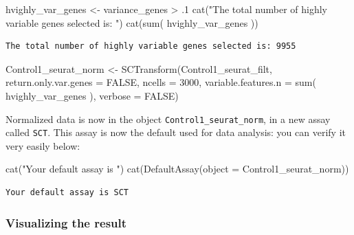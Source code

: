 \documentclass[
  letterpaper,
  DIV=11,
  numbers=noendperiod]{scrartcl}
\newenvironment{Shaded}{\begin{snugshade}}{\end{snugshade}}
\newcommand{\AttributeTok}[1]{\textcolor[rgb]{0.49,0.56,0.16}{#1}}
\newcommand{\ConstantTok}[1]{\textcolor[rgb]{0.53,0.00,0.00}{#1}}
\newcommand{\DecValTok}[1]{\textcolor[rgb]{0.25,0.63,0.44}{#1}}
\newcommand{\FunctionTok}[1]{\textcolor[rgb]{0.02,0.16,0.49}{#1}}
\newcommand{\NormalTok}[1]{\textcolor[rgb]{0.00,0.44,0.13}{#1}}
\newcommand{\OtherTok}[1]{\textcolor[rgb]{0.00,0.44,0.13}{#1}}
\newcommand{\SpecialCharTok}[1]{\textcolor[rgb]{0.25,0.44,0.63}{#1}}
\newcommand{\StringTok}[1]{\textcolor[rgb]{0.25,0.44,0.63}{#1}}
\begin{document}
\begin{Shaded}
\begin{Highlighting}[]
\NormalTok{hvighly\_var\_genes }\OtherTok{\textless{}{-}}\NormalTok{ variance\_genes }\SpecialCharTok{\textgreater{}}\NormalTok{ .}\DecValTok{1}
\FunctionTok{cat}\NormalTok{(}\StringTok{"The total number of highly variable genes selected is: "}\NormalTok{)}
\FunctionTok{cat}\NormalTok{(}\FunctionTok{sum}\NormalTok{( hvighly\_var\_genes ))}
\end{Highlighting}
\end{Shaded}

\begin{verbatim}
The total number of highly variable genes selected is: 9955
\end{verbatim}

\begin{Shaded}
\begin{Highlighting}[]
\NormalTok{Control1\_seurat\_norm }\OtherTok{\textless{}{-}} \FunctionTok{SCTransform}\NormalTok{(Control1\_seurat\_filt, }
                                             \AttributeTok{return.only.var.genes =} \ConstantTok{FALSE}\NormalTok{, }
                                             \AttributeTok{ncells =} \DecValTok{3000}\NormalTok{, }
                                             \AttributeTok{variable.features.n =} \FunctionTok{sum}\NormalTok{( hvighly\_var\_genes ),}
                                             \AttributeTok{verbose =} \ConstantTok{FALSE}\NormalTok{)}
\end{Highlighting}
\end{Shaded}

Normalized data is now in the object \texttt{Control1\_seurat\_norm}, in
a new assay called \texttt{SCT}. This assay is now the default used for
data analysis: you can verify it very easily below:

\begin{Shaded}
\begin{Highlighting}[]
\FunctionTok{cat}\NormalTok{(}\StringTok{"Your default assay is "}\NormalTok{)}
\FunctionTok{cat}\NormalTok{(}\FunctionTok{DefaultAssay}\NormalTok{(}\AttributeTok{object =}\NormalTok{ Control1\_seurat\_norm))}
\end{Highlighting}
\end{Shaded}

\begin{verbatim}
Your default assay is SCT
\end{verbatim}

\hypertarget{visualizing-the-result}{%
\subsubsection{Visualizing the result}\label{visualizing-the-result}}
\end{document}
